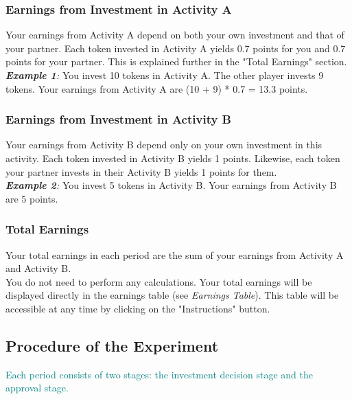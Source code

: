 \documentclass[12pt]{article}
\newcommand{\convertECU}{1 }
\newcommand{\mpcr}{0.7 }
\begin{document}
\subsubsection*{Earnings from Investment in Activity A}

\noindent Your earnings from Activity A depend on both your own investment and that of your partner. Each token invested in Activity A yields \mpcr points for you and \mpcr points for your partner. This is explained further in the "Total Earnings" section.\\

\noindent \textit{\textbf{Example 1}:}
You invest 10 tokens in Activity A. The other player invests 9 tokens. Your earnings from Activity A are (10 + 9) * 0.7 = 13.3 points.

\subsubsection*{Earnings from Investment in Activity B}

\noindent Your earnings from Activity B depend only on your own investment in this activity. Each token invested in Activity B yields \convertECU points. Likewise, each token your partner invests in their Activity B yields \convertECU points for them.\\

\noindent \textit{\textbf{Example 2}:}
You invest 5 tokens in Activity B. Your earnings from Activity B are 5 points.

\subsubsection*{Total Earnings}

\noindent Your total earnings in each period are the sum of your earnings from Activity A and Activity B.\\

\noindent You do not need to perform any calculations. Your total earnings will be displayed directly in the earnings table (see \textit{Earnings Table}). This table will be accessible at any time by clicking on the "Instructions" button.

\subsection*{Procedure of the Experiment}

\textcolor{teal}{\noindent Each period consists of two stages: the investment decision stage and the approval stage.}
\end{document}
